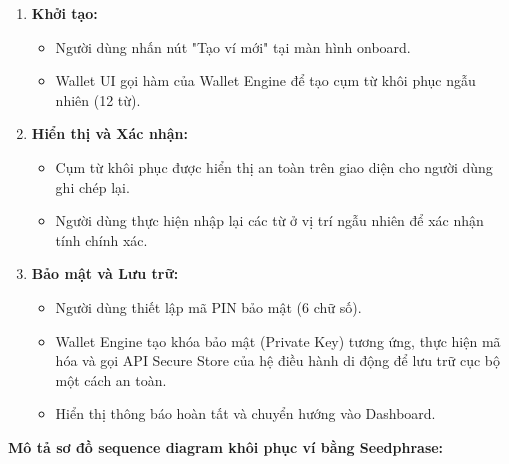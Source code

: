 \documentclass[a4paper]{report}
\begin{document}
\begin{enumerate}
    \item \textbf{Khởi tạo:}
    \begin{itemize}
        \item Người dùng nhấn nút "Tạo ví mới" tại màn hình onboard.
        \item Wallet UI gọi hàm của Wallet Engine để tạo cụm từ khôi phục ngẫu nhiên (12 từ).
    \end{itemize}

    \item \textbf{Hiển thị và Xác nhận:}
    \begin{itemize}
        \item Cụm từ khôi phục được hiển thị an toàn trên giao diện cho người dùng ghi chép lại.
        \item Người dùng thực hiện nhập lại các từ ở vị trí ngẫu nhiên để xác nhận tính chính xác.
    \end{itemize}

    \item \textbf{Bảo mật và Lưu trữ:}
    \begin{itemize}
        \item Người dùng thiết lập mã PIN bảo mật (6 chữ số).
        \item Wallet Engine tạo khóa bảo mật (Private Key) tương ứng, thực hiện mã hóa và gọi API Secure Store của hệ điều hành di động để lưu trữ cục bộ một cách an toàn.
        \item Hiển thị thông báo hoàn tất và chuyển hướng vào Dashboard.
    \end{itemize}
\end{enumerate}


\textbf{Mô tả sơ đồ sequence diagram khôi phục ví bằng Seedphrase:}
\end{document}
